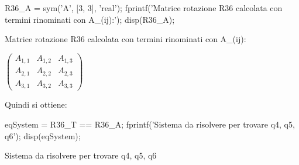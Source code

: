 \documentclass[11pt, a4paper]{article}
\begin{document}
\begin{matlabcode}
R36_A = sym('A', [3, 3], 'real');
fprintf('Matrice rotazione R36 calcolata con termini rinominati con A_(ij):');
disp(R36_A);
\end{matlabcode}
\begin{matlaboutput}
Matrice rotazione R36 calcolata con termini rinominati con A_(ij):
\end{matlaboutput}
\begin{matlabsymbolicoutput}
$\displaystyle \left(\begin{array}{ccc}
A_{1,1}  & A_{1,2}  & A_{1,3} \\
A_{2,1}  & A_{2,2}  & A_{2,3} \\
A_{3,1}  & A_{3,2}  & A_{3,3}
\end{array}\right)$
\end{matlabsymbolicoutput}

\begin{par}
\begin{flushleft}
Quindi si ottiene:
\end{flushleft}
\end{par}

\begin{matlabcode}
eqSystem = R36_T == R36_A;
fprintf('Sistema da risolvere per trovare q4, q5, q6');
disp(eqSystem);
\end{matlabcode}
\begin{matlaboutput}
Sistema da risolvere per trovare q4, q5, q6
\end{matlaboutput}
\begin{matlabsymbolicoutput}
\end{matlabsymbolicoutput}
\end{document}
